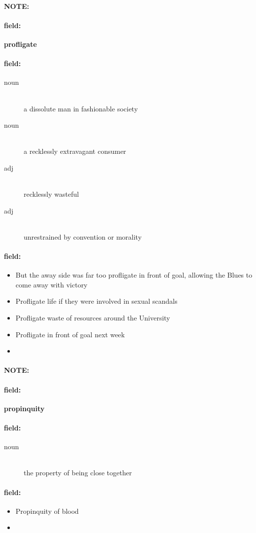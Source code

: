 \documentclass[12pt]{article}
\newenvironment{note}{\paragraph{NOTE:}}{}
\newenvironment{field}{\paragraph{field:}}{}
\begin{document}
\begin{note}
\begin{field}
\textbf{\large profligate}
\end{field}


\begin{field}
\begin{description}
\item[noun] \hfill \\ 
a dissolute man in fashionable society

\item[noun] \hfill \\ 
a recklessly extravagant consumer

\item[adj] \hfill \\ 
recklessly wasteful

\item[adj] \hfill \\ 
unrestrained by convention or morality

\end{description}
\end{field}

\begin{field}
\begin{itemize}
\item But the away side was far too profligate in front of goal, allowing the Blues to come away with victory
\item Profligate life if they were involved in sexual scandals
\item Profligate waste of resources around the University
\item Profligate in front of goal next week
\item 
\end{itemize}
\end{field}
\end{note}
\begin{note}
\begin{field}
\textbf{\large propinquity}
\end{field}


\begin{field}
\begin{description}
\item[noun] \hfill \\ 
the property of being close together

\end{description}
\end{field}

\begin{field}
\begin{itemize}
\item Propinquity of blood
\item 
\end{itemize}
\end{field}
\end{note}
\end{document}
